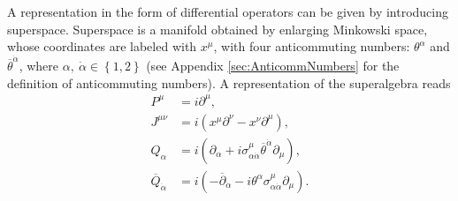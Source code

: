 A representation in the form of differential operators can be given by introducing superspace. Superspace is a manifold obtained by enlarging Minkowski space, whose coordinates are labeled with $x^\mu$, with four anticommuting numbers: $\theta^\alpha$ and $\overline{\theta}^{\dot{\alpha}}$, where $\alpha,\ \dot{\alpha} \in \left\{ 1,2 \right\}$ (see Appendix \ref{sec:AnticommNumbers} for the definition of anticommuting numbers). A representation of the superalgebra reads
\begin{align}
P^\mu &= i\partial^\mu,\nonumber\\
J^{\mu\nu} &= i(x^\mu\partial^\nu - x^\nu\partial^\mu),\nonumber\\
Q_\alpha &= i(\partial_\alpha + i\sigma^\mu_{\alpha\dot{\alpha}}
\overline{\theta}^{\dot{\alpha}}\partial_\mu),\nonumber\\
\overline{Q}_{\dot{\alpha}} &= i(-\overline{\partial}_{\dot{\alpha}} - i \theta^\alpha \sigma^\mu_{\alpha\dot{\alpha}}\partial_\mu).\label{eq:SUSYGen}
\end{align}



